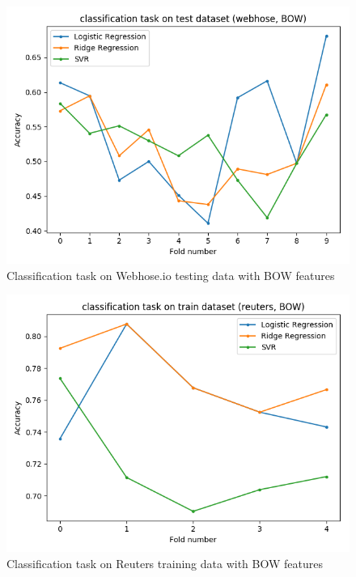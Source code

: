 \documentclass[sigconf]{acmart}
\begin{document}
\begin{figure}
  \includegraphics[width=\linewidth]{../../picture/experiment/classification_test_(webhose,_BOW).png}
  \caption{Classification task on Webhose.io testing data with BOW features}
  \label{fig:web_cls_bow}
\end{figure}

\begin{figure}
  \includegraphics[width=\linewidth]{../../picture/experiment/classification_train_(reuters,_BOW).png}
  \caption{Classification task on Reuters training data with BOW features}
  \label{fig:re_tr_cls_bow}
\end{figure}
\end{document}
